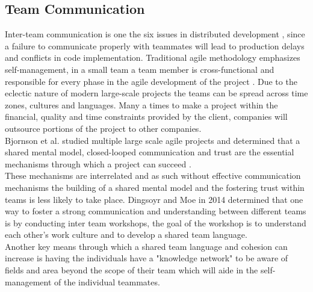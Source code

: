 \documentclass[sigplan,screen]{acmart}
\begin{document}
\subsection{Team Communication}
Inter-team communication is one the six issues in distributed development \cite{Jeff}, since a failure to communicate properly with teammates will lead to production delays and conflicts in code implementation. Traditional agile methodology emphasizes self-management, in a small team a team member is cross-functional and responsible for every phase in the agile development of the project \cite{Dingsoyr}. Due to the eclectic nature of modern large-scale projects the teams can be spread across time zones, cultures and languages. Many a times to make a project within the financial, quality and time constraints provided by the client, companies will outsource portions of the project to other companies.  \\
Bjornson et al. studied multiple large scale agile projects and determined that a shared mental model, closed-looped communication and trust are the essential mechanisms through which a project can succeed \cite{Bjornson}. \\
These mechanisms are interrelated and as such without effective communication mechanisms the building of a shared mental model and the fostering trust within teams is less likely to take place. Dingsoyr and Moe in 2014 determined that one way to foster a strong communication and understanding between different teams is by conducting inter team workshops, the goal of the workshop is to understand each other's work  culture and to develop a shared team language.\\
 Another key means through which a shared team language and cohesion can increase is having the individuals have a "knowledge network" to be aware of fields and area beyond the scope of their team which will aide in the self-management of the individual teammates\cite{Dingsoyr}.\\
\end{document}
